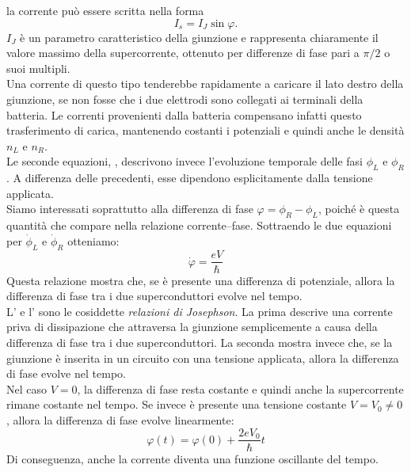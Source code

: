 la corrente può essere scritta nella forma
\begin{equation}
    I_s
    =
    I_J\sin\varphi.
    \label{eq:current_phase_relation}
\end{equation}
$I_J$ è un parametro caratteristico della giunzione e rappresenta chiaramente il valore massimo della supercorrente, ottenuto per differenze di fase pari a $\pi/2$ o suoi multipli.\\
Una corrente di questo tipo tenderebbe rapidamente a caricare il lato destro della giunzione, se non fosse che i due elettrodi sono collegati ai terminali della batteria. Le correnti provenienti dalla batteria compensano infatti questo trasferimento di carica, mantenendo costanti i potenziali e quindi anche le densità $n_L$ e $n_R$.\\
Le seconde equazioni, , descrivono invece l'evoluzione temporale delle fasi $\phi_L$ e $\phi_R$. A differenza delle precedenti, esse dipendono esplicitamente dalla tensione applicata.\\
Siamo interessati soprattutto alla differenza di fase $\varphi=\phi_R-\phi_L$, poiché è questa quantità che compare nella relazione corrente--fase. Sottraendo le due equazioni per $\dot{\phi}_L$ e $\dot{\phi}_R$ otteniamo:
\begin{equation}
    \dot{\varphi}=\frac{eV}{\hbar}
    \label{eq:phase_voltage_relation}
\end{equation}
Questa relazione mostra che, se è presente una differenza di potenziale, allora la differenza di fase tra i due superconduttori evolve nel tempo.\\
L' e l' sono le cosiddette \emph{relazioni di Josephson}. La prima descrive una corrente priva di dissipazione che attraversa la giunzione semplicemente a causa della differenza di fase tra i due superconduttori. La seconda mostra invece che, se la giunzione è inserita in un circuito con una tensione applicata, allora la differenza di fase evolve nel tempo.\\
Nel caso $V=0$, la differenza di fase resta costante e quindi anche la supercorrente rimane costante nel tempo. Se invece è presente una tensione costante $V=V_0\neq0$, allora la differenza di fase evolve linearmente:
\begin{equation*}
    \varphi(t)=\varphi(0)+\frac{2eV_0}{\hbar}t
\end{equation*}
Di conseguenza, anche la corrente diventa una funzione oscillante del tempo.\\
